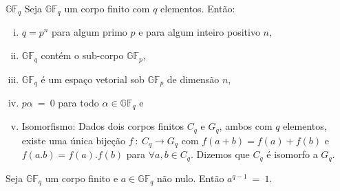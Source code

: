 




\begin{theorem} {\bf $\mathbb{GF}_q$} \label{GFq}  Seja $\mathbb{GF}_q$ um corpo finito com $q$ elementos. Então:
   \begin{enumerate}[(i)]
     \item $q = p^n$ para algum primo $p$ e para algum inteiro positivo $n$,
     \item $\mathbb{GF}_q$ contém o sub-corpo $\mathbb{GF}_p$,
     \item $\mathbb{GF}_q$ é um espaço vetorial sob $\mathbb{GF}_p$ de dimensão $n$,
     \item $p\alpha\ =\ 0$ para todo $\alpha \in \mathbb{GF}_q$ e
     \item Isomorfismo:  Dados dois corpos finitos $C_q$ e $G_q$, ambos com $q$ elementos, existe uma única bijeção $f\ :\ C_q \rightarrow G_q$ com $f(a+b)=f(a)+f(b)$ e $f(a.b)=f(a).f(b)$ para $\forall a,b \in C_q$. Dizemos que  $C_q$ é isomorfo a $G_q$.
   \end{enumerate}
\end{theorem}


\begin{theorem} \label{teorema1} Seja $\mathbb{GF}_q$ um corpo finito e $a \in \mathbb{GF}_q$ não nulo. Então $a^{q-1}\ =\ 1$.
\end{theorem}

